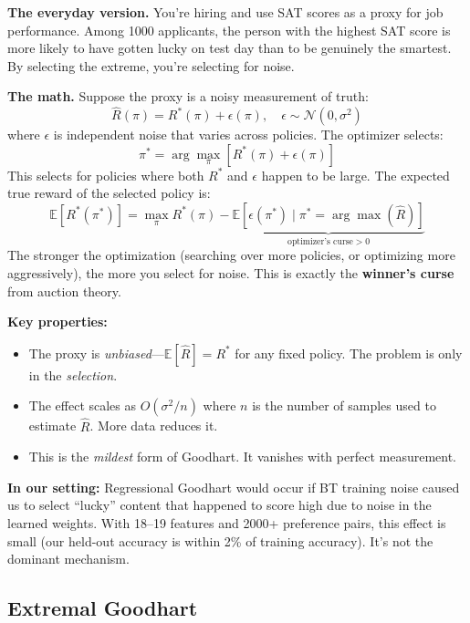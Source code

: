 \documentclass[11pt]{article}
\begin{document}
\textbf{The everyday version.} You're hiring and use SAT scores as a
proxy for job performance. Among 1000 applicants, the person with the
highest SAT score is more likely to have gotten lucky on test day than
to be genuinely the smartest. By selecting the extreme, you're selecting
for noise.

\textbf{The math.} Suppose the proxy is a noisy measurement of truth:
\begin{equation}
  \hat{R}(\pi) = R^*(\pi) + \epsilon(\pi), \quad
  \epsilon \sim \mathcal{N}(0, \sigma^2)
\end{equation}
where $\epsilon$ is independent noise that varies across policies.
The optimizer selects:
\begin{equation}
  \pi^* = \arg\max_\pi \left[ R^*(\pi) + \epsilon(\pi) \right]
\end{equation}
This selects for policies where both $R^*$ and $\epsilon$ happen to be
large. The expected true reward of the selected policy is:
\begin{equation}
  \mathbb{E}[R^*(\pi^*)] = \max_\pi R^*(\pi) - \underbrace{
    \mathbb{E}\!\left[\epsilon(\pi^*) \mid \pi^* = \arg\max(\hat{R})\right]
  }_{\text{optimizer's curse} > 0}
\end{equation}
The stronger the optimization (searching over more policies, or
optimizing more aggressively), the more you select for noise. This is
exactly the \textbf{winner's curse} from auction theory.

\textbf{Key properties:}
\begin{itemize}
  \item The proxy is \emph{unbiased}---$\mathbb{E}[\hat{R}] = R^*$ for
    any fixed policy. The problem is only in the \emph{selection}.
  \item The effect scales as $O(\sigma^2 / n)$ where $n$ is the number
    of samples used to estimate $\hat{R}$. More data reduces it.
  \item This is the \emph{mildest} form of Goodhart. It vanishes with
    perfect measurement.
\end{itemize}

\textbf{In our setting:} Regressional Goodhart would occur if BT
training noise caused us to select ``lucky'' content that happened to
score high due to noise in the learned weights. With 18--19 features and
2000+ preference pairs, this effect is small (our held-out accuracy is
within 2\% of training accuracy). It's not the dominant mechanism.

\subsection{Extremal Goodhart}
\end{document}

